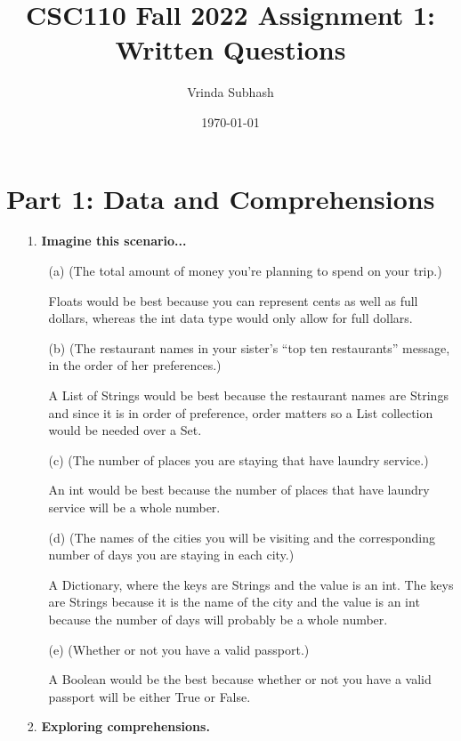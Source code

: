 \documentclass[12pt]{article}
\title{CSC110 Fall 2022 Assignment 1: Written Questions}
\author{Vrinda Subhash}
\date{\today}
\begin{document}
\maketitle

\section*{Part 1: Data and Comprehensions}

\begin{enumerate}
\item[1.] \textbf{Imagine this scenario...}
\begin{enumerate}
\item[(a)] (The total amount of money you're planning to spend on your trip.)

Floats would be best because you can represent cents as well as full dollars, whereas the int data type would only allow for full dollars.

\item[(b)] (The restaurant names in your sister's ``top ten restaurants'' message, in the order of her preferences.)

A List of Strings would be best because the restaurant names are Strings and since it is in order of preference, order matters so a List collection would be needed over a Set.

\item[(c)] (The number of places you are staying that have laundry service.)

An int would be best because the number of places that have laundry service will be a whole number.

\item[(d)] (The names of the cities you will be visiting and the corresponding number of days you are staying in each city.)

A Dictionary, where the keys are Strings and the value is an int. The keys are Strings because it is the name of the city and the value is an int because the number of days will probably be a whole number.

\item[(e)] (Whether or not you have a valid passport.)

A Boolean would be the best because whether or not you have a valid passport will be either True or False.
\end{enumerate}

\item[2.] \textbf{Exploring comprehensions.}


\end{enumerate}
\end{document}
